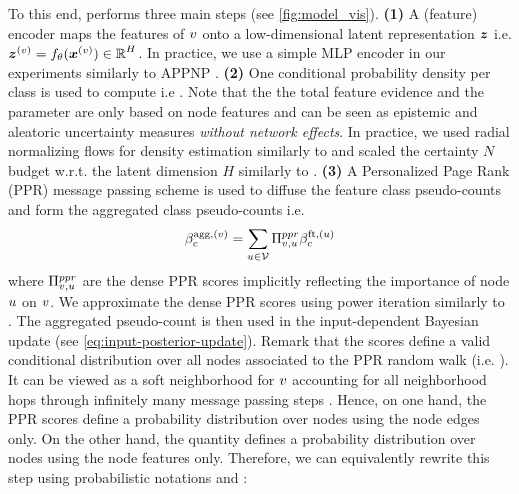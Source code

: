 To this end, \GPNacro{} performs three main steps (see \cref{fig:model_vis}). \textbf{(1)} A (feature) encoder maps the features of $v$ onto a low-dimensional latent representation $\bm{z}$ i.e. $\bm{z}^{(v)} = f_\theta(\bm{x}^{(v)}) \in \operatorname{\mathbb{R}}^H$. In practice, we use a simple MLP encoder in our experiments similarly to APPNP \citep{Klicpera2018}. \textbf{(2)} One conditional probability density per class \smash{$\prob(\z^{(\nodev)} \condition \iclass; \vphi)$} is used to compute  i.e . Note that the the total feature evidence  and the parameter  are only based on node features and can be seen as epistemic and aleatoric uncertainty measures \emph{without network effects}. In practice, we used radial normalizing flows for density estimation similarly to \citep{charpentier2020} and scaled the certainty $N$ budget w.r.t. the latent dimension $H$ similarly to \citep{NatPN2021}. \textbf{(3)} A Personalized Page Rank (PPR) message passing scheme is used to diffuse the feature class pseudo-counts  and form the aggregated class pseudo-counts  i.e.
\begin{equation}\label{eq:agg-evidence}
    \beta_c^{\text{agg}, (v)} = \sum_{u \in \mathcal{V}} \Pi^{ppr}_{v, u} \beta_c^{\text{ft}, (u)}
\end{equation}
where $\Pi^{ppr}_{v, u}$ are the dense PPR scores implicitly reflecting the importance of node $u$ on $v$. We approximate the dense PPR scores using power iteration similarly to \citep{Klicpera2018}. The aggregated pseudo-count  is then used in the input-dependent Bayesian update (see \cref{eq:input-posterior-update}). Remark that the scores  define a valid conditional distribution over all nodes associated to the PPR random walk (i.e. ). It can be viewed as a soft neighborhood for $v$ accounting for all neighborhood hops through infinitely many message passing steps \citep{Klicpera2018}. Hence, on one hand, the PPR scores define a probability distribution over nodes using the node edges only. On the other hand, the quantity \smash{$\prob(\z^{(\nodeu)} \condition \iclass; \vphi)$} defines a probability distribution over nodes using the node features only. Therefore, we can equivalently rewrite this step using probabilistic notations  and \smash{$\prob(\nodeu \condition \iclass) = \prob(\z^{(\nodeu)} \condition \iclass; \vphi)$}:
